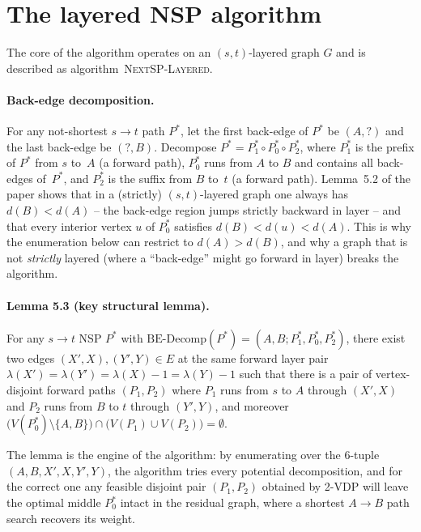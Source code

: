 \section{The layered NSP algorithm}

The core of the algorithm operates on an $(s,t)$-layered graph $G$ and is
described as algorithm~\textsc{NextSP-Layered}.

\paragraph{Back-edge decomposition.} For any not-shortest $s\to t$ path
$P^{*}$, let the first back-edge of $P^{*}$ be $(A,?)$ and the last back-edge
be $(?,B)$. Decompose $P^{*} = P_1^{*} \circ P_0^{*} \circ P_2^{*}$, where
$P_1^{*}$ is the prefix of $P^{*}$ from $s$ to~$A$ (a forward path),
$P_0^{*}$ runs from $A$ to $B$ and contains all back-edges of~$P^{*}$, and
$P_2^{*}$ is the suffix from $B$ to~$t$ (a forward path). Lemma~5.2 of the
paper shows that in a (strictly) $(s,t)$-layered graph one always has
$d(B)<d(A)$ -- the back-edge region jumps strictly backward in layer --
and that every interior vertex $u$ of $P_0^{*}$ satisfies
$d(B)<d(u)<d(A)$. This is why the enumeration below can restrict to
$d(A)>d(B)$, and why a graph that is not \emph{strictly} layered (where a
``back-edge'' might go forward in layer) breaks the algorithm.

\paragraph{Lemma 5.3 (key structural lemma).} For any $s\to t$ NSP
$P^{*}$ with $\text{BE-Decomp}(P^{*}) = (A,B; P_1^{*}, P_0^{*}, P_2^{*})$,
there exist two edges $(X',X),(Y',Y)\in E$ at the same forward layer pair
$\lambda(X')=\lambda(Y')=\lambda(X)-1=\lambda(Y)-1$ such that there is a
pair of vertex-disjoint forward paths $(P_1,P_2)$ where $P_1$ runs from $s$
to $A$ through $(X',X)$ and $P_2$ runs from $B$ to $t$ through $(Y',Y)$, and
moreover $\bigl(V(P_0^{*})\setminus\{A,B\}\bigr)\cap\bigl(V(P_1)\cup
V(P_2)\bigr) = \emptyset$.

The lemma is the engine of the algorithm: by enumerating over the
$6$-tuple $(A,B,X',X,Y',Y)$, the algorithm tries every potential
decomposition, and for the correct one any feasible disjoint pair
$(P_1,P_2)$ obtained by 2-VDP will leave the optimal middle $P_0^{*}$ intact
in the residual graph, where a shortest $A\to B$ path search recovers its
weight.

